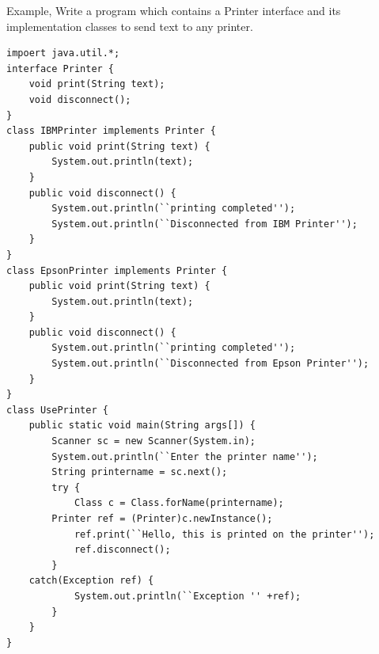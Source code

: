 \documentclass[11pt,a4paper]{article}
\begin{document}
Example, Write a program which contains a Printer interface and its implementation classes to send text to any printer.
\begin{lstlisting}[numbers=none]
impoert java.util.*;
interface Printer {
    void print(String text);
    void disconnect();
}
class IBMPrinter implements Printer {
    public void print(String text) {
        System.out.println(text);
    }
    public void disconnect() {
        System.out.println(``printing completed'');
        System.out.println(``Disconnected from IBM Printer'');
    }
}
class EpsonPrinter implements Printer {
    public void print(String text) {
        System.out.println(text);
    }
    public void disconnect() {
        System.out.println(``printing completed'');
        System.out.println(``Disconnected from Epson Printer'');
    }
}
class UsePrinter {
    public static void main(String args[]) {
        Scanner sc = new Scanner(System.in);
        System.out.println(``Enter the printer name'');
        String printername = sc.next();
        try {
            Class c = Class.forName(printername);
	    Printer ref = (Printer)c.newInstance();
            ref.print(``Hello, this is printed on the printer'');
            ref.disconnect();
       	}
	catch(Exception ref) {
            System.out.println(``Exception '' +ref);
        }
    }
}
\end{lstlisting}
\end{document}
